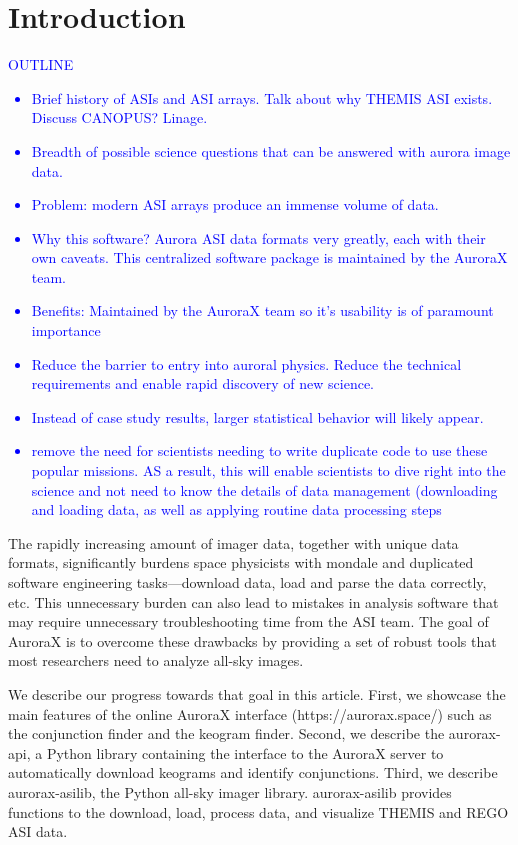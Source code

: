 \documentclass[draft]{agujournal2019}
\begin{document}
\section{Introduction}\label{intro}
\textcolor{blue}{
      OUTLINE
      \begin{itemize}
            \item Brief history of ASIs and ASI arrays. Talk about why THEMIS ASI exists. Discuss CANOPUS? Linage.
            \item Breadth of possible science questions that can be answered with aurora image data.
            \item Problem: modern ASI arrays produce an immense volume of data.
            \item Why this software? Aurora ASI data formats very greatly, each with their own caveats. This centralized software package is maintained by the AuroraX team. 
            \item Benefits: Maintained by the AuroraX team so it's usability is of paramount importance
            \item Reduce the barrier to entry into auroral physics. Reduce the technical requirements and  enable rapid discovery of new science.
            \item Instead of case study results, larger statistical behavior will likely appear.
            \item remove the need for scientists needing to write duplicate code to use these popular missions. AS a result, this will enable scientists to dive right into the science and not need to know the details of data management (downloading and loading data, as well as applying routine data processing steps
      \end{itemize}
}

The rapidly increasing amount of imager data, together with unique data formats, significantly burdens space physicists with mondale and duplicated software engineering tasks---download data, load and parse the data correctly, etc. This unnecessary burden can also lead to mistakes in analysis software that may require unnecessary troubleshooting time from the ASI team. The goal of AuroraX is to overcome these drawbacks by providing a set of robust tools that most researchers need to analyze all-sky images. 

We describe our progress towards that goal in this article. First, we showcase the main features of the online AuroraX interface (https://aurorax.space/) such as the conjunction finder and the keogram finder. Second, we describe the aurorax-api, a Python library containing the interface to the AuroraX server to automatically download keograms and identify conjunctions. Third, we describe aurorax-asilib, the Python all-sky imager library. aurorax-asilib provides functions to the download, load, process data, and visualize THEMIS and REGO ASI data. 
\end{document}
